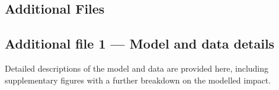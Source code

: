 \documentclass[doublespacing]{bmcart}
\begin{document}
\begin{backmatter}
\section*{Additional Files}
%

  \subsection*{Additional file 1 --- Model and data details}
    Detailed descriptions of the model and data are provided here, including supplementary figures with a further breakdown on the modelled impact. 


\end{backmatter}
\end{document}
